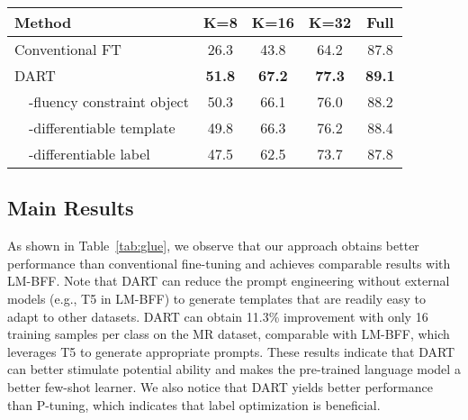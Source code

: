 \documentclass{article} \usepackage{iclr2022_conference,times}
\newcommand{\tf}[1]{\textbf{#1}}
\newcommand{\oursopt}{DART}
\newcommand{\tableindent}{~~}
\begin{document}
\begin{table*}[!htb]
    \begin{center}
    \small
    \centering
\begin{tabular}{l c c c c}
    \toprule
    \tf{Method}
    & \tf{K=8} & \tf{K=16} & \tf{K=32} & \tf{Full} \\
    \toprule
    Conventional FT   &26.3   &43.8  &64.2  &87.8   \\
    {\oursopt}    & \tf{51.8}   &\tf{67.2}  & \tf{77.3}      &\tf{89.1}   \\
    \midrule
    \tableindent -fluency constraint object & 50.3 \tiny{\color{blue}{(-1.5)}} & 66.1 \tiny{\color{blue}{(-1.1)}}
    & 76.0  \tiny{\color{blue}{(-1.3)}}& 88.2  \tiny{\color{blue}{(-0.9)}} \\
    \tableindent -differentiable template  &49.8 \tiny{\color{blue}{(-2.0)}} &66.3 \tiny{\color{blue}{(-0.9)}} & 76.2 \tiny{\color{blue}{(-1.1)}}     &88.4 \tiny{\color{blue}{(-0.7)}}  \\
    \tableindent -differentiable label &47.5 \tiny{\color{blue}{(-4.3)}}  &62.5 \tiny{\color{blue}{(-4.7)}}     &73.7 \tiny{\color{blue}{(-0.6)}}  &87.8 \tiny{\color{blue}{(-1.3)}}  \\

    \bottomrule
    \end{tabular}
\end{center}
    \caption{Ablation of DART with different components on SemEval. (FT= Fine tuning)
    }
    \label{tab:pair_ablation}
\end{table*}


\subsection{Main Results}

As shown in Table~\ref{tab:glue}, we observe that our approach obtains better performance than conventional fine-tuning and achieves comparable results with LM-BFF. 
Note that DART can reduce the prompt engineering without external models (e.g., T5 in LM-BFF) to generate templates that are readily easy to adapt to other datasets. 
DART can obtain 11.3\% improvement with only 16 training samples per class on the MR dataset, comparable with LM-BFF, which leverages T5 to generate appropriate prompts.
These results indicate that DART can better stimulate potential ability and makes the pre-trained language model a better few-shot learner. 
We also notice that DART yields better performance than P-tuning, which indicates that label optimization is beneficial. 
\end{document}
